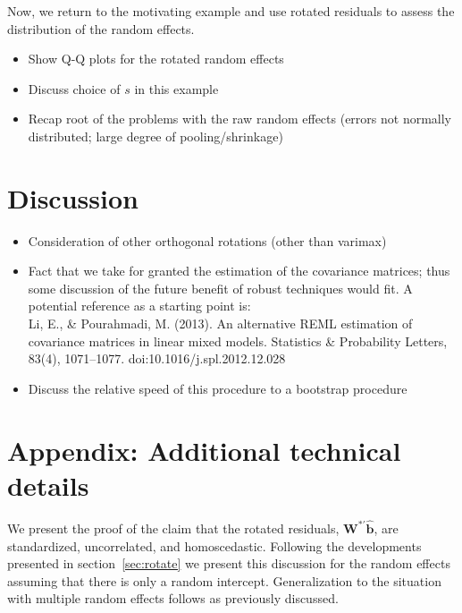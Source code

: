 \documentclass{article} %
\newcommand{\al}[1]{{\color{red} #1}}
\begin{document}
Now, we return to the motivating example and use rotated residuals to assess the distribution of the random effects.

\begin{itemize}
\item Show Q-Q plots for the rotated random effects
\item Discuss choice of $s$ in this example
\item Recap root of the problems with the raw random effects (errors not normally distributed; large degree of pooling/shrinkage)
\end{itemize}

\section{Discussion}\label{sec:discussion}

\begin{itemize}
\item Consideration of other orthogonal rotations (other than varimax)
\item Fact that we take for granted the estimation of the covariance matrices; thus some discussion of the future benefit of robust techniques would fit. A potential reference as a starting point is:\\ Li, E., \& Pourahmadi, M. (2013). An alternative REML estimation of covariance matrices in linear mixed models. Statistics \& Probability Letters, 83(4), 1071--1077. doi:10.1016/j.spl.2012.12.028
\item Discuss the relative speed of this procedure to a bootstrap procedure
\end{itemize}

\section*{Appendix: Additional technical details}

\al{
We present the proof of the claim that the rotated residuals, $\bm{W}^{*\prime} \widehat{\bm{b}}$, are standardized, uncorrelated, and homoscedastic. Following the developments presented in section~\ref{sec:rotate} we present this discussion for the random effects assuming that there is only a random intercept. Generalization to the situation with multiple random effects follows as previously discussed.
}
\end{document}
